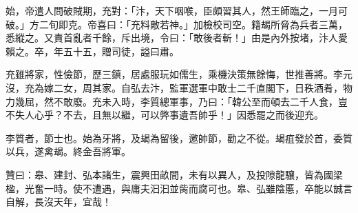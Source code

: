 \begin{pinyinscope}
 始，帝遣人問破賊期，充對：「汴，天下咽喉，臣頗習其人，然王師臨之，一月可破。」方二旬即克。帝喜曰：「充料敵若神。」加檢校司空。籍朅所脅為兵者三萬，悉縱之。又責首亂者千餘，斥出境，令曰：「敢後者斬！」由是內外按堵，汴人愛賴之。卒，年五十五，贈司徒，謚曰肅。



 充雖將家，性儉節，歷三鎮，居處服玩如儒生，乘機決策無餘悔，世推善將。李元沒，充為嫁二女，周其家。自弘去汴，監軍選軍中敢士二千直閣下，日秩酒肴，物力幾屈，然不敢廢。充未入時，李質總軍事，乃曰：「韓公至而頓去二千人食，豈不失人心乎？不去，且無以繼，可以弊事遺吾帥乎！」因悉罷之而後迎充。



 李質者，節士也。始為牙將，及朅為留後，邀帥節，勸之不從。朅疽發於首，委質以兵，遂禽朅。終金吾將軍。



 贊曰：皋、建封、弘本諸生，震興田畝間，未有以異人，及投隙龍驤，皆為國梁楹，光奮一時。使不遭遇，與庸夫汩汩並胔而腐可也。皋、弘雖陰慝，卒能以誠言自解，長沒天年，宜哉！



\end{pinyinscope}